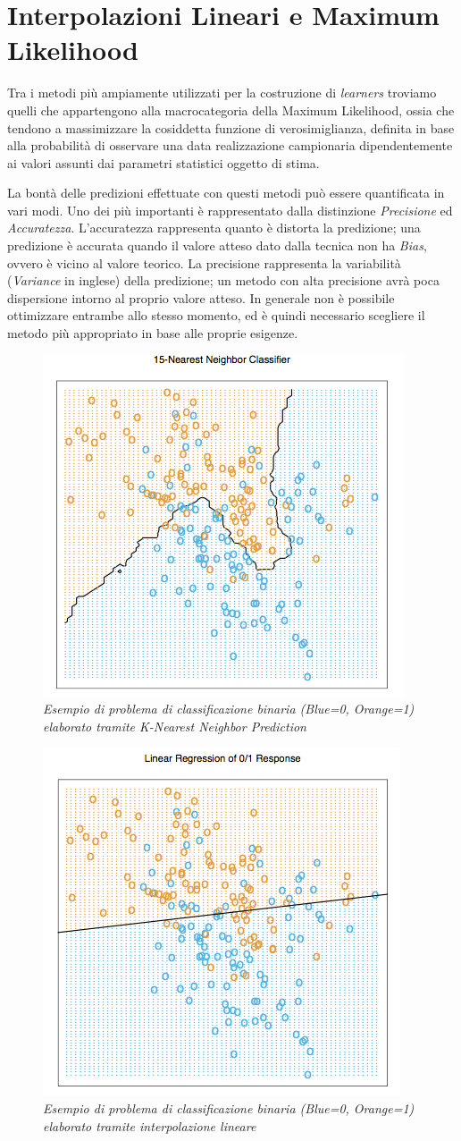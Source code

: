 \documentclass[12pt,openright,twoside,a4paper]{book}
\begin{document}
\section{Interpolazioni Lineari e Maximum Likelihood}
Tra i metodi più ampiamente utilizzati per la costruzione di \textit{learners} troviamo quelli che appartengono alla macrocategoria della Maximum Likelihood, ossia che tendono a massimizzare la cosiddetta funzione di verosimiglianza, definita in base alla probabilità di osservare una data realizzazione campionaria dipendentemente ai valori assunti dai parametri statistici oggetto di stima.

La bontà delle predizioni effettuate con questi metodi può essere quantificata in vari modi.
Uno dei più importanti è rappresentato dalla distinzione \textit{Precisione} ed \textit{Accuratezza}.
L'accuratezza rappresenta quanto è distorta la predizione; una predizione è accurata quando il valore atteso dato dalla tecnica non ha \textit{Bias}, ovvero è vicino al valore teorico.
La precisione rappresenta la variabilità (\textit{Variance} in inglese) della predizione; un metodo con alta precisione avrà poca dispersione intorno al proprio valore atteso.
In generale non è possibile ottimizzare entrambe allo stesso momento, ed è quindi necessario scegliere il metodo più appropriato in base alle proprie esigenze.

\begin{figure}[!h]
\centering
\includegraphics[width=0.45\linewidth]{neighclass}
\caption{\textit{Esempio di problema di classificazione binaria (Blue=0, Orange=1) elaborato tramite K-Nearest Neighbor Prediction}}
\label{neighclass}
\end{figure}

\begin{figure}[!h]
\centering
\includegraphics[width=0.45\linewidth]{linclass}
\caption{\textit{Esempio di problema di classificazione binaria (Blue=0, Orange=1) elaborato tramite interpolazione lineare}}
\label{linclass}
\end{figure}
\end{document}
